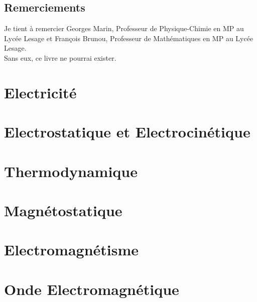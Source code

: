 \documentclass[a4paper, titlepage,twoside]{book}
\begin{document}
\chapter{Remerciements}
Je tient à remercier Georges Marin, Professeur de Physique-Chimie en MP au Lycée Lesage et François Brunou, Professeur de Mathématiques en MP au Lycée Lesage.\\
Sans eux, ce livre ne pourrai exister.\\
\mainmatter                   %
\part{Electricité}
\setcounter{chapter}{0}
\part{Electrostatique et Electrocinétique}
\setcounter{chapter}{0}
\part{Thermodynamique}
\setcounter{chapter}{0}







\part{Magnétostatique}
\setcounter{chapter}{0}

\part{Electromagnétisme}
\setcounter{chapter}{0}




\part{Onde Electromagnétique}
\setcounter{chapter}{0}




\end{document}
